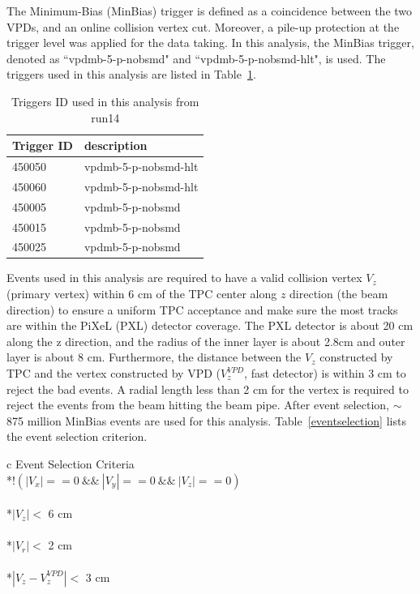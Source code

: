 \documentclass[a4paper]{article}
\begin{document}
The Minimum-Bias (MinBias) trigger is defined as a coincidence between the two VPDs, and an online collision vertex cut. Moreover, a pile-up protection at the trigger level was applied for the data taking. In this analysis, the MinBias trigger, denoted as ``vpdmb-5-p-nobsmd" and ``vpdmb-5-p-nobsmd-hlt", is used. The triggers used in this analysis are listed in Table~\ref{trigger}.

\begin{table}[htp]
\centering
\caption{Triggers ID used in this analysis from run14}
\label{trigger}
	\begin{center}
	\begin{tabular}{l|l}
	Trigger ID	& description\\ \hline
	450050		& vpdmb-5-p-nobsmd-hlt\\ \hline
	450060		& vpdmb-5-p-nobsmd-hlt\\ \hline
	450005		& vpdmb-5-p-nobsmd\\ \hline
	450015		& vpdmb-5-p-nobsmd\\ \hline
	450025		& vpdmb-5-p-nobsmd\\ \hline
	\end{tabular}
	\end{center}
\end{table}

Events used in this analysis are required to have a valid collision vertex $V_{z}$ (primary vertex) within 6 cm of the TPC center along $z$ direction (the beam direction) to ensure a uniform TPC acceptance and make sure the most tracks are within the PiXeL (PXL) detector coverage. The PXL detector is about 20 cm along the z direction, and the radius of the inner layer is about 2.8cm and outer layer is about 8 cm. Furthermore, the distance between the $V_{z}$ constructed by TPC and the vertex constructed by VPD ($V_{z}^{VPD}$, fast detector) is within 3 cm to reject the bad events. A radial length less than 2 cm for the vertex is required to reject the events from the beam hitting the beam pipe. After event selection, $\sim$875 million MinBias events are used for this analysis. Table~\ref{eventselection} lists the event selection criterion.

\begin{table}[htp]
\centering
\caption{Event selection in Au+Au collisions at 200 GeV for $D^0$.}
\label{eventselection}
\begin{tabular}{c}
\toprule[1.6pt]
Event Selection Criteria \\
\midrule[1.2pt]
*{$!(|V_{x}|== 0 \ \&\& \ |V_{y}|== 0 \  \&\& \  |V_{z}|== 0) $ } \\
\\
*{$|V_{z}|<$ 6 cm} \\
\\
*{$|V_{r}|<$ 2 cm} \\
\\
*{$|V_{z} - V_{z}^{VPD}|<$ 3 cm} \\ 
\\  
\bottomrule[1.6pt]
\end{tabular}
\end{table}
\end{document}
